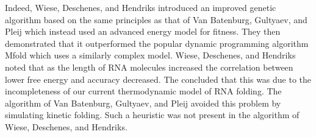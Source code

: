 \documentclass{cshonours}
\begin{document}
Indeed, Wiese, Deschenes, and Hendriks \cite{wiese2008rnapredict} introduced an improved
genetic algorithm based on the same principles as that of Van Batenburg, Gultyaev,
and Pleij which instead used an advanced energy model for fitness. They then
demonstrated that it outperformed the popular dynamic programming algorithm
Mfold \cite{zuker2003mfold} which uses a similarly complex model. Wiese, Deschenes, and Hendriks noted that as the length of RNA molecules increased the correlation between lower free energy and accuracy decreased. The concluded that this was due to the incompleteness of our current thermodynamic model of RNA folding. The algorithm of Van Batenburg, Gultyaev, and Pleij avoided this problem by simulating kinetic folding. Such a heuristic was not present in the algorithm of Wiese, Deschenes, and Hendriks.
\end{document}

